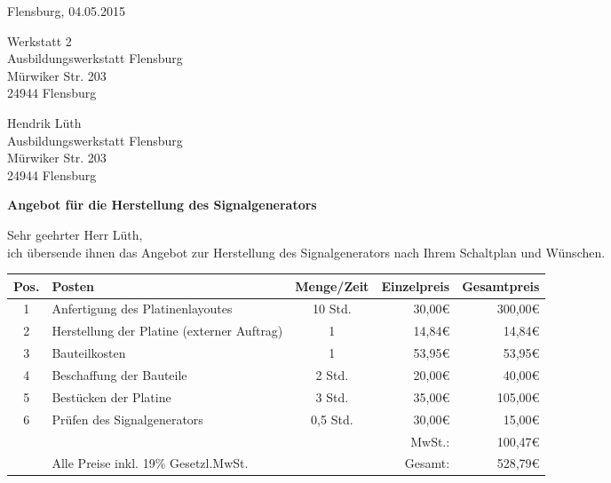 \pagebreak
Flensburg, 04.05.2015
\begin{flushright}
Werkstatt 2\\
Ausbildungswerkstatt Flensburg\\
Mürwiker Str. 203\\
24944 Flensburg
\end{flushright}
\bigskip
\bigskip
\bigskip
Hendrik Lüth\\
Ausbildungswerkstatt Flensburg\\
Mürwiker Str. 203\\
24944 Flensburg\\
\begin{flushleft}
\bigskip

\textbf{Angebot für die Herstellung des Signalgenerators}
\bigskip
\bigskip

Sehr geehrter Herr Lüth,\\
\bigskip
ich übersende ihnen das Angebot zur Herstellung des Signalgenerators nach Ihrem Schaltplan und Wünschen.\\
\medskip

\begin{tabular}{cp{7cm}cr|r|}
\hline
\multicolumn{1}{|l|}{Pos.} & \multicolumn{1}{l|}{Posten} & \multicolumn{1}{l|}{Menge/Zeit} & Einzelpreis & Gesamtpreis \\ \hline
\multicolumn{1}{|c|}{1} & \multicolumn{1}{l|}{Anfertigung des Platinenlayoutes} & \multicolumn{1}{c|}{10 Std.} & 30,00\euro & 300,00\euro \\ \hline
\multicolumn{1}{|c|}{2} & \multicolumn{1}{l|}{Herstellung der Platine (externer Auftrag)} & \multicolumn{1}{c|}{1} & 14,84\euro & 14,84\euro \\ \hline
\multicolumn{1}{|c|}{3} & \multicolumn{1}{l|}{Bauteilkosten} & \multicolumn{1}{c|}{1} & 53,95\euro & 53,95\euro \\ \hline
\multicolumn{1}{|c|}{4} & \multicolumn{1}{l|}{Beschaffung der Bauteile} & \multicolumn{1}{c|}{2 Std.} & 20,00\euro & 40,00\euro \\ \hline
\multicolumn{1}{|c|}{5} & \multicolumn{1}{l|}{Bestücken der Platine} & \multicolumn{1}{c|}{3 Std.} & 35,00\euro & 105,00\euro \\ \hline
\multicolumn{1}{|c|}{6} & \multicolumn{1}{l|}{Prüfen des Signalgenerators} & \multicolumn{1}{c|}{0,5 Std.} & 30,00\euro & 15,00\euro \\ \hline
 & & & MwSt.: & 100,47\euro \\ \cline{5-5}
                       & Alle Preise inkl. 19\% Gesetzl.MwSt. &                       & Gesamt: & 528,79\euro \\ \cline{5-5} 
\end{tabular}\\
\bigskip


\end{flushleft}
